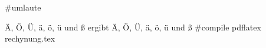 #umlaute

\"A, \"O, \"U, \"a, \"o, \"u und \ss{} ergibt Ä, Ö, Ü, ä, ö, ü und ß
#compile
pdflatex rechynung.tex
